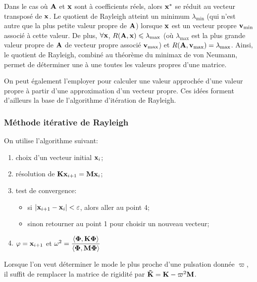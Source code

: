 Dans le cas où $\MM{A}$ et $\VV{x}$ sont à coefficients réels, alors $\VV{x}^{*}$ se réduit au vecteur transposé de $\VV{x}$.
\medskipvm
Le quotient de Rayleigh atteint un minimum $\lambda_{\min}$ (qui n'est autre que la plus petite valeur propre de $\MM{A}$) 
lorsque $\VV{x}$ est un vecteur propre $\VV{v}_{\min}$ associé à cette valeur.
\medskipvm
De plus, $\forall \VV{x}$, $R(\MM{A}, \VV{x}) \leq \lambda_{\max}$ (où $\lambda_{\max}$ est la plus grande
valeur propre de $\MM{A}$ de vecteur propre associé $\VV{v}_{\max}$) et $R(\MM{A}, \VV{v}_{\max}) = \lambda_{\max}$. 
Ainsi, le quotient de Rayleigh, combiné au théorème du minimax de von Neumann, 
permet de déterminer une à une toutes les valeurs propres d'une matrice. 

On peut également l'employer pour calculer une valeur approchée d'une valeur propre à partir d'une approximation 
d'un vecteur propre. 
Ces idées forment d'ailleurs la base de l’algorithme d’itération de Rayleigh.

\medskip
\subsubsection{Méthode itérative de Rayleigh}

On utilise l'algorithme suivant:
\begin{enumerate}
   \item choix d'un vecteur initial $\VV{x}_i$;
   \item résolution de $\MM{K}\VV{x}_{i+1} = \MM{M} \VV{x}_i$;
   \item test de convergence:
	\begin{itemize}
	   \item si $|\VV{x}_{i+1}-\VV{x}_i|<\varepsilon$, alors aller au point 4;
	   \item sinon retourner au point 1 pour choisir un nouveau vecteur;
	\end{itemize}
   \item $\VV{\varphi}=\VV{x}_{i+1}$ et $\omega^2=\dfrac{\langle \VV{\Phi}, \MM{K}\VV{\Phi}\rangle}{\langle \VV{\Phi}, \MM{M}\VV{\Phi}\rangle}$
\end{enumerate}
\medskipvm
Lorsque l'on veut déterminer le mode le plus proche d'une pulsation donnée $\varpi$, il suffit de remplacer
la matrice de rigidité par $\MM{\tilde{K}}=\MM{K} - \varpi^2 \MM{M}$.
\medskipvm
{}

